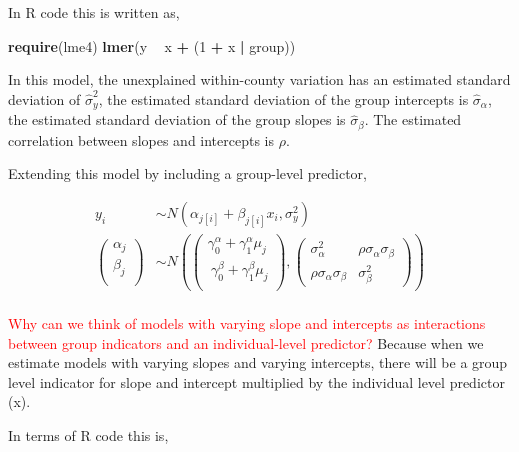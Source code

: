 \documentclass[12pt,]{article}
\newenvironment{Shaded}{\begin{snugshade}}{\end{snugshade}}
\newcommand{\KeywordTok}[1]{\textcolor[rgb]{0.13,0.29,0.53}{\textbf{#1}}}
\newcommand{\DecValTok}[1]{\textcolor[rgb]{0.00,0.00,0.81}{#1}}
\newcommand{\StringTok}[1]{\textcolor[rgb]{0.31,0.60,0.02}{#1}}
\newcommand{\OperatorTok}[1]{\textcolor[rgb]{0.81,0.36,0.00}{\textbf{#1}}}
\newcommand{\NormalTok}[1]{#1}
\begin{document}
In R code this is written as,

\begin{Shaded}
\begin{Highlighting}[]
\KeywordTok{require}\NormalTok{(lme4)}
\KeywordTok{lmer}\NormalTok{(y }\OperatorTok{~}\StringTok{ }\NormalTok{x }\OperatorTok{+}\StringTok{ }\NormalTok{(}\DecValTok{1} \OperatorTok{+}\StringTok{ }\NormalTok{x }\OperatorTok{|}\StringTok{ }\NormalTok{group))}
\end{Highlighting}
\end{Shaded}

In this model, the unexplained within-county variation has an estimated
standard deviation of \(\hat{\sigma}^2_y\), the estimated standard
deviation of the group intercepts is \(\hat{\sigma}_\alpha\), the
estimated standard deviation of the group slopes is
\(\hat{\sigma}_\beta\). The estimated correlation between slopes and
intercepts is \(\rho\).

Extending this model by including a group-level predictor,

\[
\begin{aligned}
y_i &\sim N (\alpha_{j[i]} + \beta_{j[i]}x_i, \sigma^2_y)\\
\begin{pmatrix}
\alpha_j\\
\beta_j\\
\end{pmatrix} &\sim N \left(\begin{pmatrix}\gamma^\alpha_0 + \gamma_1^\alpha \mu_j\\\ \gamma_0^\beta + \gamma_1^\beta \mu_j\\ 
\end{pmatrix}, 
\begin{pmatrix}
\sigma^2_\alpha & \rho \sigma_\alpha \sigma_\beta\\
\rho \sigma_\alpha \sigma_\beta & \sigma^2_\beta
\end{pmatrix} 
\right)\\
\end{aligned}
\]

\textcolor{red}{Why can we think of models with varying slope and intercepts as interactions between group indicators and an individual-level predictor?}
Because when we estimate models with varying slopes and varying
intercepts, there will be a group level indicator for slope and
intercept multiplied by the individual level predictor (x).

In terms of R code this is,
\end{document}

